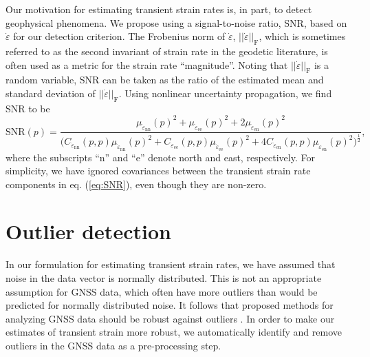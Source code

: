 \documentclass[extra,mreferee]{gji}
\begin{document}
Our motivation for estimating transient strain rates is, in part, to detect geophysical phenomena. We propose using a signal-to-noise ratio, SNR, based on $\dot\varepsilon$ for our detection criterion. The Frobenius norm of $\dot\varepsilon$, $||\dot\varepsilon||_\mathrm{F}$, which is sometimes referred to as the second invariant of strain rate in the geodetic literature, is often used as a metric for the strain rate ``magnitude''. Noting that $||\dot\varepsilon||_\mathrm{F}$ is a random variable, SNR can be taken as the ratio of the estimated mean and standard deviation of $||\dot\varepsilon||_\mathrm{F}$. Using nonlinear uncertainty propagation, we find SNR to be  
\begin{equation}\label{eq:SNR}
\mathrm{SNR}(p) = \frac{\mu_{\dot\varepsilon_\mathrm{nn}}(p)^2 +
                        \mu_{\dot\varepsilon_\mathrm{ee}}(p)^2 +
                        2\mu_{\dot\varepsilon_\mathrm{en}}(p)^2}
                       {\big(C_{\dot\varepsilon_\mathrm{nn}}(p,p)\mu_{\dot\varepsilon_\mathrm{nn}}(p)^2 + 
                              C_{\dot\varepsilon_\mathrm{ee}}(p,p)\mu_{\dot\varepsilon_\mathrm{ee}}(p)^2 + 
                              4C_{\dot\varepsilon_\mathrm{en}}(p,p)\mu_{\dot\varepsilon_\mathrm{en}}(p)^2
                        \big)^{\frac{1}{2}}}
,
\end{equation}
where the subscripts ``n'' and ``e'' denote north and east, respectively. For simplicity, we have ignored covariances between the transient strain rate components in eq. (\ref{eq:SNR}), even though they are non-zero.  

\section{Outlier detection}\label{sec:Outlier}
In our formulation for estimating transient strain rates, we have assumed that noise in the data vector is normally distributed. This is not an appropriate assumption for GNSS data, which often have more outliers than would be predicted for normally distributed noise. It follows that proposed methods for analyzing GNSS data should be robust against outliers \citep[e.g.,][]{Blewitt2016}. In order to make our estimates of transient strain more robust, we automatically identify and remove outliers in the GNSS data as a pre-processing step.
\end{document}
